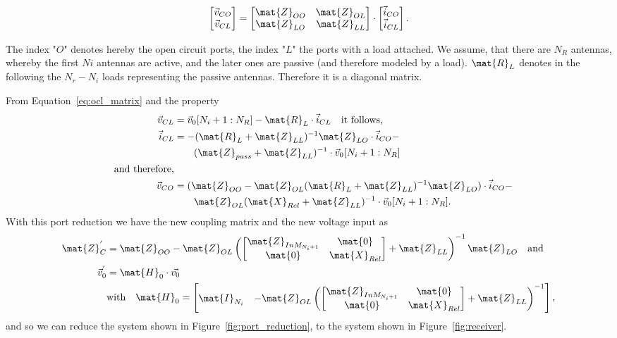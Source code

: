 \begin{align}
\label{eq:ocl_matrix}
\begin{bmatrix}
\vec{v}_{CO} \\
\vec{v}_{CL}
\end{bmatrix}
=
\begin{bmatrix}
\mat{Z}_{OO} & \mat{Z}_{OL}\\
\mat{Z}_{LO} & \mat{Z}_{LL}
\end{bmatrix}\cdot
\begin{bmatrix}
\vec{i}_{CO} \\
\vec{i}_{CL}
\end{bmatrix}.
\end{align}

The index "$O$" denotes hereby the open circuit ports, the index "$L$" the ports with a load attached.
We assume, that there are $N_R$ antennas, whereby the first $Ni$ antennas are active, and the later ones are passive (and therefore modeled by a load).
$\mat{R}_{L}$ denotes in the following the $N_r - N_i$ loads representing the passive antennas.
Therefore it is a diagonal matrix.

From Equation~\eqref{eq:ocl_matrix} and the property
\begin{align}
\vec{v}_{CL} &= \vec{v}_0[N_i+1:N_R]-\mat{R}_{L}\cdot\vec{i}_{CL}\quad\text{it follows,}\\
\vec{i}_{CL} &= -(\mat{R}_{L} + \mat{Z}_{LL})^{-1}\mat{Z}_{LO}\cdot\vec{i}_{CO} -\\\nonumber
&\qquad (\mat{Z}_{pass} + \mat{Z}_{LL})^{-1}\cdot\vec{v}_{0}[N_i+1:N_R]\\\nonumber\quad\text{and therefore,}&\\
\vec{v}_{CO} &= (\mat{Z}_{OO}-\mat{Z}_{OL}(\mat{R}_{L} + \mat{Z}_{LL})^{-1}\mat{Z}_{LO})\cdot\vec{i}_{CO} -\\\nonumber&\qquad \mat{Z}_{OL}(\mat{X}_{Rel} + \mat{Z}_{LL})^{-1}\cdot\vec{v}_0[N_i+1:N_R].
\end{align}
With this port reduction we have the new coupling matrix and the new voltage input as
\begin{align}
\mat{Z}_C^{'}&= \mat{Z}_{OO} - \mat{Z}_{OL}\left(
\begin{bmatrix}
\mat{Z}_{InM_{N_i+1}} & \mat{0}\\
\mat{0} & \mat{X}_{Rel}
\end{bmatrix}
 + \mat{Z}_{LL}\right)^{-1}\mat{Z}_{LO}\quad\text{and}\\
\vec{v}_0^{'} &= \mat{H}_0 \cdot \vec{v_0}\\\nonumber
&\text{with}\quad\mat{H}_0=
\begin{bmatrix}
\mat{I}_{N_i} & -\mat{Z}_{OL}\left(
\begin{bmatrix}
\mat{Z}_{InM_{N_i+1}} & \mat{0}\\
\mat{0} & \mat{X}_{Rel}
\end{bmatrix}
 + \mat{Z}_{LL}\right)^{-1}
\end{bmatrix},
\end{align}
and so we can reduce the system shown in Figure~\ref{fig:port_reduction}, to the system shown in Figure~\ref{fig:receiver}.

